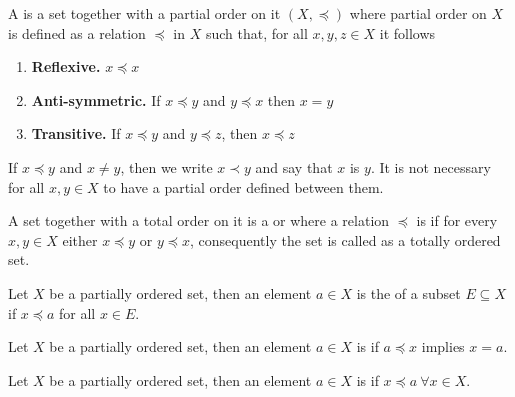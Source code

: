 \documentclass[11pt,a4paper]{article}
\begin{document}
\begin{definition}
    A  is a set together with a partial order on it $(X,\preccurlyeq)$ where partial order on $X$ is defined as a relation $\preccurlyeq$ in $X$ such that, for all $x, y, z \in X$ it follows 
    \begin{enumerate}
        \item \textbf{Reflexive.} $x \preccurlyeq x$
        \item \textbf{Anti-symmetric.} If $x \preccurlyeq y$ and $y \preccurlyeq x$ then $x = y$
        \item \textbf{Transitive.} If $x \preccurlyeq y$ and $y \preccurlyeq z$, then $x \preccurlyeq z$
    \end{enumerate}
\end{definition}

\begin{remark}
    If $x \preccurlyeq y$ and $x \neq y$, then we write $x \prec y$ and say that $x$ is  $y$. It is not necessary for all $x, y \in X$ to have a partial order defined between them.
\end{remark}

\begin{definition}
    A set together with a total order on it is a  or  where a relation $\preccurlyeq$ is  if for every $x, y \in X$ either $x \preccurlyeq y$ or $y \preccurlyeq x$, consequently the set is called as a totally ordered set.
\end{definition}

\begin{definition}
    Let $X$ be a partially ordered set, then an element $a\in X$ is the  of a subset $E\subseteq X$ if $x \preccurlyeq a$ for all $x \in E$.
\end{definition}

\begin{definition}
    Let $X$ be a partially ordered set, then an element $a\in X$ is  if $a \preccurlyeq x$ implies $x = a$.
\end{definition}

\begin{definition}
    Let $X$ be a partially ordered set, then an element $a \in X$ is  if $x \preccurlyeq a\ \forall x \in X$.
\end{definition}
\end{document}
